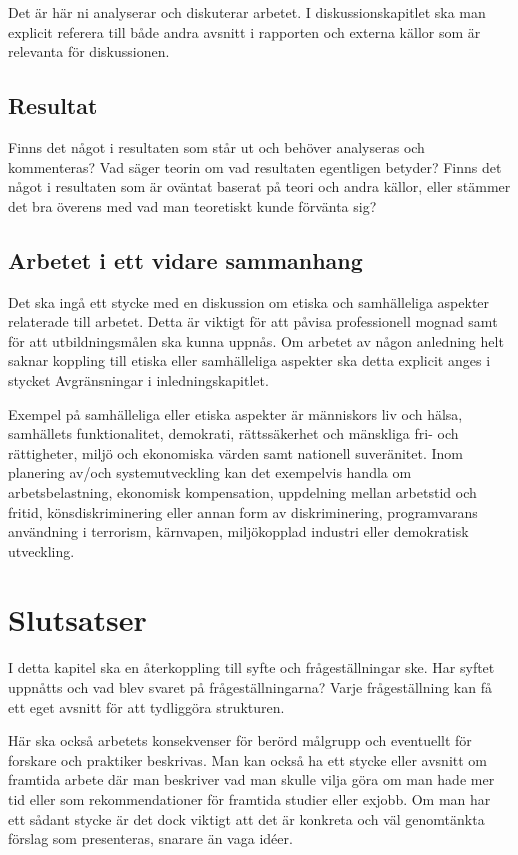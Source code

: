 \documentclass[a4paper,12pt,oneside,final]{extbook}
\begin{document}
Det är här ni analyserar och diskuterar arbetet. I diskussionskapitlet
ska man explicit referera till både andra avsnitt i rapporten och
externa källor som är relevanta för diskussionen.


\section{Resultat}

Finns det något i resultaten som står ut och behöver analyseras och
kommenteras? Vad säger teorin om vad resultaten egentligen betyder?
Finns det något i resultaten som är oväntat baserat på teori och andra
källor, eller stämmer det bra överens med vad man teoretiskt kunde
förvänta sig?

\section{Arbetet i ett vidare sammanhang}

Det ska ingå ett stycke med en diskussion om etiska och samhälleliga
aspekter relaterade till arbetet. Detta är viktigt för att påvisa
professionell mognad samt för att utbildningsmålen ska kunna
uppnås. Om arbetet av någon anledning helt saknar koppling till etiska
eller samhälleliga aspekter ska detta explicit anges i stycket
Avgränsningar i inledningskapitlet.

Exempel på samhälleliga eller etiska aspekter är människors liv och
hälsa, samhällets funktionalitet, demokrati, rättssäkerhet och
mänskliga fri- och rättigheter, miljö och ekonomiska värden samt
nationell suveränitet. Inom planering av/och systemutveckling kan det
exempelvis handla om arbetsbelastning, ekonomisk kompensation,
uppdelning mellan arbetstid och fritid, könsdiskriminering eller annan
form av diskriminering, programvarans användning i terrorism,
kärnvapen, miljökopplad industri eller demokratisk utveckling.


\chapter{Slutsatser}

I detta kapitel ska en återkoppling till syfte och frågeställningar
ske. Har syftet uppnåtts och vad blev svaret på frågeställningarna?
Varje frågeställning kan få ett eget avsnitt för att tydliggöra
strukturen.

Här ska också arbetets konsekvenser för berörd målgrupp och eventuellt
för forskare och praktiker beskrivas. Man kan också ha ett stycke
eller avsnitt om framtida arbete där man beskriver vad man skulle
vilja göra om man hade mer tid eller som rekommendationer för framtida
studier eller exjobb. Om man har ett sådant stycke är det dock viktigt
att det är konkreta och väl genomtänkta förslag som presenteras,
snarare än vaga idéer.
\end{document}
